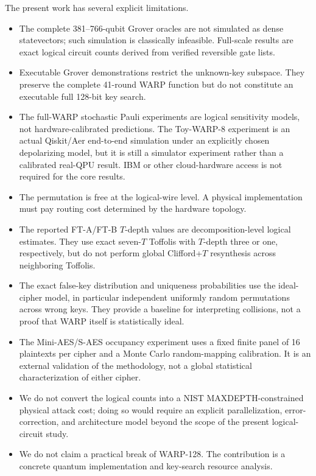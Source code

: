 \documentclass[10pt,a4paper]{article}
\begin{document}
The present work has several explicit limitations.
\begin{itemize}
    \item The complete 381--766-qubit Grover oracles are not simulated as dense statevectors; such simulation is classically infeasible. Full-scale results are exact logical circuit counts derived from verified reversible gate lists.
    \item Executable Grover demonstrations restrict the unknown-key subspace. They preserve the complete 41-round WARP function but do not constitute an executable full 128-bit key search.
    \item The full-WARP stochastic Pauli experiments are logical sensitivity models, not hardware-calibrated predictions. The Toy-WARP-8 experiment is an actual Qiskit/Aer end-to-end simulation under an explicitly chosen depolarizing model, but it is still a simulator experiment rather than a calibrated real-QPU result. IBM or other cloud-hardware access is not required for the core results.
    \item The permutation is free at the logical-wire level. A physical implementation must pay routing cost determined by the hardware topology.
    \item The reported FT-A/FT-B $T$-depth values are decomposition-level logical estimates. They use exact seven-$T$ Toffolis with $T$-depth three or one, respectively, but do not perform global Clifford+$T$ resynthesis across neighboring Toffolis.
    \item The exact false-key distribution and uniqueness probabilities use the ideal-cipher model, in particular independent uniformly random permutations across wrong keys.  They provide a baseline for interpreting collisions, not a proof that WARP itself is statistically ideal.
    \item The Mini-AES/S-AES occupancy experiment uses a fixed finite panel of 16 plaintexts per cipher and a Monte Carlo random-mapping calibration.  It is an external validation of the methodology, not a global statistical characterization of either cipher.
    \item We do not convert the logical counts into a NIST MAXDEPTH-constrained physical attack cost; doing so would require an explicit parallelization, error-correction, and architecture model beyond the scope of the present logical-circuit study.
    \item We do not claim a practical break of WARP-128. The contribution is a concrete quantum implementation and key-search resource analysis.
\end{itemize}
\end{document}
